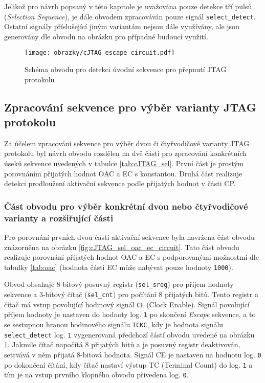 Jelikož pro návrh popsaný v této kapitole je uvažována pouze detekce tří pulsů (\textit{Selection Sequence}), je dále obvodem zpracováván pouze signál \texttt{select\_detect}. Ostatní signály příslušející jiným variantám nejsou dále využívány, ale jsou generovány dle obvodu na obrázku pro případné budoucí využití.

\begin{figure}[H]
  \begin{center}
    \texttt{[image: obrazky/cJTAG\_escape\_circuit.pdf]}
  \end{center}
  \caption{Schéma obvodu pro detekci úvodní sekvence pro přepnutí \acs{JTAG} protokolu}
	\label{fig:cJTAG_escape_circuit}
\end{figure}

\subsection{Zpracování sekvence pro výběr varianty \acs{JTAG} protokolu}	\label{subsec:sel_seq_det}
Za účelem zpracování sekvence pro výběr dvou či čtyřvodičové varianty \acs{JTAG} protokolu byl návrh obvodu rozdělen na dvě části pro zpracování konkrétních úseků sekvence uvedených v tabulce \ref{tab:cJTAG_sel}. První část je prostým porovnáním přijatých hodnot \acs{OAC} a \acs{EC} s konstantou. Druhá část realizuje detekci prodloužení aktivační sekvence podle přijatých hodnot v části \acs{CP}.

\subsubsection{Část obvodu pro výběr konkrétní dvou nebo čtyřvodičové varianty a rozšiřující části}
Pro porovnání prvních dvou částí aktivační sekvence byla navržena část obvodu znázorněna na obrázku \ref{fig:cJTAG_sel_oac_ec_circuit}. Tato část obvodu realizuje porovnání přijatých hodnot \acs{OAC} a \acs{EC} s podporovanými možnostmi dle tabulky \ref{tab:oac} (hodnota části \acs{EC} může nabývat pouze hodnoty \texttt{1000}).

Obvod obsahuje 8-bitový posuvný registr (\texttt{sel\_sreg}) pro příjem hodnoty sekvence a 3-bitový čítač (\texttt{sel\_cnt}) pro počítání 8 přijatých bitů. Tento registr a čítač má vstup povolující hodinový signál \texttt{CE} (Clock Enable). Signál povolující příjem hodnoty je nastaven do hodnoty log. \texttt{1} po skončení \textit{Escape} sekvence, a to se sestupnou hranou hodinového signálu \texttt{\acs{TCKC}}, kdy je hodnota signálu \texttt{select\_detect} log. \texttt{1} vygenerovaná předchozí částí obvodu uvedené na obrázku \ref{fig:cJTAG_escape_circuit}. Jakmile čítač napočítá 8 přijatých bitů a je posuvný registr deaktivován, setrvává v něm přijatá 8-bitová hodnota. Signál CE je nastaven na hodnotu log. \texttt{0} po dokončení čítání, kdy čítač nastaví výstup TC (Terminal Count) do log. \texttt{1} a tím je na vstup prvního klopného obvodu přivedena log. \texttt{0}.

